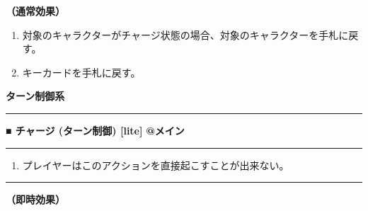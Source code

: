 \documentclass[twocolumn,a5paper,papersize,10pt]{jarticle}
\begin{document}
{\bf（通常効果）}


\vspace{-1zh}%
\begin{enumerate}
\setlength{\leftskip}{-0.3cm}
\setlength{\parskip}{0pt} %

\item 対象のキャラクターがチャージ状態の場合、対象のキャラクターを手札に戻す。

\item キーカードを手札に戻す。
\vspace{-1zh}%
\end{enumerate}


\begin{tcolorbox}
{\scriptsize\bf ターン制御系}
\end{tcolorbox}
\vspace{-1zh}%
\vspace{2mm} %
\hrule height 0.5mm depth 0mm width 66.5mm %
\vspace{1mm} %
{\normalsize\bf ■ チャージ {\scriptsize (ターン制御) [lite]}} %
\hfill 
{\small\bf @メイン }


\vspace{1mm}%
\hrule height 0.1mm depth 0mm width 66.5mm %
\vspace{1mm}%


\vspace{-1zh}%
\begin{enumerate}
\renewcommand{\labelenumi}{※}
\setlength{\leftskip}{-0.3cm}
\setlength{\itemsep}{0pt} %
\setlength{\parskip}{0pt} %

\item プレイヤーはこのアクションを直接起こすことが出来ない。

\vspace{-3mm}%
\end{enumerate}
\vspace{1mm}%
\hrule height 0.1mm depth 0mm width 66.5mm %
\vspace{1mm}%

{\bf（即時効果）}
\end{document}
